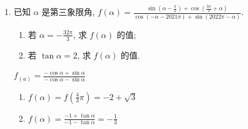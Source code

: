 \begin{enumerate}
\item 已知 $\alpha$ 是第三象限角, $f(\alpha)=\frac{\sin \left(\alpha-\frac{\pi}{2}\right)+\cos \left(\frac{3 \pi}{2}+\alpha\right)}{\cos (-\alpha-2021 \pi)+\sin (2022 \pi-\alpha)}$.
\begin{enumerate}
    \item 若 $\alpha=-\frac{32 \pi}{3}$, 求 $f(\alpha)$ 的值;
    \item 若 $\tan \alpha=2$, 求 $f(\alpha)$ 的值.
\end{enumerate}
\begin{jieda}
$f_{(a)}=\frac{-\cos \alpha+\sin \alpha}{-\cos \alpha-\sin \alpha}$
    \begin{enumerate}
        \item $f(\alpha)=f\left(\frac{4}{3} \pi\right)=-2+\sqrt{3}$
        \item $f(\alpha)=\frac{-1+\tan \alpha}{-1-\tan \alpha}=-\frac{1}{3}$
    \end{enumerate}
\end{jieda}


\end{enumerate}

